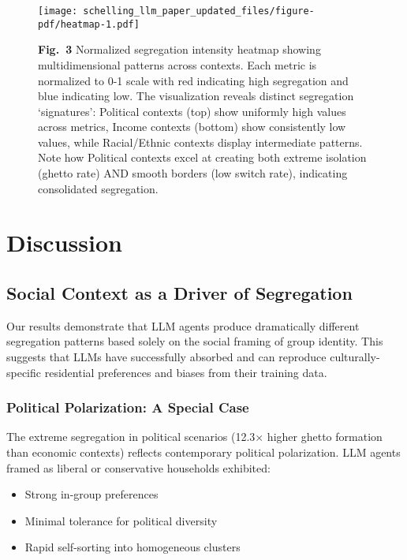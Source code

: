\documentclass[pdflatex,sn-basic]{sn-jnl}%
\begin{document}

\begin{figure}[ht]
\centering
\texttt{[image: schelling\_llm\_paper\_updated\_files/figure-pdf/heatmap-1.pdf]}
\caption{\textbf{Fig.~3} Normalized segregation intensity heatmap showing
multidimensional patterns across contexts. Each metric is normalized to
0-1 scale with red indicating high segregation and blue indicating low.
The visualization reveals distinct segregation `signatures': Political
contexts (top) show uniformly high values across metrics, Income
contexts (bottom) show consistently low values, while Racial/Ethnic
contexts display intermediate patterns. Note how Political contexts
excel at creating both extreme isolation (ghetto rate) AND smooth
borders (low switch rate), indicating consolidated segregation.}
\label{fig:heatmap}
\end{figure}

\section{Discussion}\label{discussion}

\subsection{Social Context as a Driver of
Segregation}\label{social-context-as-a-driver-of-segregation}

Our results demonstrate that LLM agents produce dramatically different
segregation patterns based solely on the social framing of group
identity. This suggests that LLMs have successfully absorbed and can
reproduce culturally-specific residential preferences and biases from
their training data.

\subsubsection{Political Polarization: A Special
Case}\label{political-polarization-a-special-case}

The extreme segregation in political scenarios (12.3× higher ghetto
formation than economic contexts) reflects contemporary political
polarization. LLM agents framed as liberal or conservative households
exhibited: 
\begin{itemize}
\item Strong in-group preferences 
\item Minimal tolerance for
political diversity 
\item Rapid self-sorting into homogeneous clusters
\end{itemize}
\end{document}

